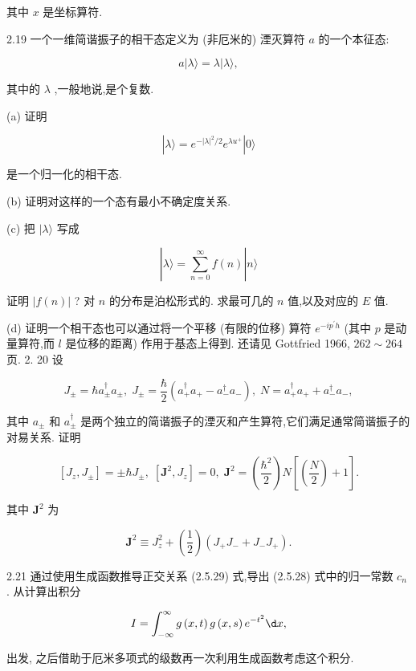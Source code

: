其中 $x$ 是坐标算符.

2.19 一个一维简谐振子的相干态定义为 (非厄米的) 湮灭算符 $a$ 的一个本征态:

$$
a\left| {\lambda \rangle = \lambda }\right| \lambda \rangle ,
$$

其中的 $\lambda$ ,一般地说,是个复数.

(a) 证明

$$
\left| {\lambda \rangle = {e}^{-{\left| \lambda \right| }^{2}/2}{e}^{\lambda {u}^{ + }}}\right| 0\rangle
$$

是一个归一化的相干态.

(b) 证明对这样的一个态有最小不确定度关系.

(c) 把 $|\lambda \rangle$ 写成

$$
\left| {\lambda \rangle = \mathop{\sum }\limits_{{n = 0}}^{\infty }f\left( n\right) }\right| n\rangle
$$

证明 $\left| {f\left( n\right) }\right|$ ? 对 $n$ 的分布是泊松形式的. 求最可几的 $n$ 值,以及对应的 $E$ 值.

(d) 证明一个相干态也可以通过将一个平移 (有限的位移) 算符 ${e}^{-i{p}^{\prime }h}$ (其中 $p$ 是动量算符,而 $l$ 是位移的距离) 作用于基态上得到. 还请见 Gottfried 1966, ${262} \sim {264}$ 页. 2. 20 设

$$
{J}_{ \pm } = \hbar {a}_{ \pm }^{ \dagger }{a}_{ \pm },\;{J}_{ \pm } = \frac{\hbar }{2}\left( {{a}_{ + }^{ \dagger }{a}_{ + } - {a}_{ - }^{ \dagger }{a}_{ - }}\right) ,\;N = {a}_{ + }^{ \dagger }{a}_{ + } + {a}_{ - }^{ \dagger }{a}_{ - },
$$

其中 ${a}_{ \pm }$ 和 ${a}_{ \pm }^{ \dagger }$ 是两个独立的简谐振子的湮灭和产生算符,它们满足通常简谐振子的对易关系. 证明

$$
\left\lbrack {{J}_{z},{J}_{ \pm }}\right\rbrack = \pm \hbar {J}_{ \pm },\;\left\lbrack {{\mathbf{J}}^{2},{J}_{z}}\right\rbrack = 0,\;{\mathbf{J}}^{2} = \left( \frac{{\hbar }^{2}}{2}\right) N\left\lbrack {\left( \frac{N}{2}\right) + 1}\right\rbrack .
$$

其中 ${\mathbf{J}}^{2}$ 为

$$
{\mathbf{J}}^{2} \equiv {J}_{z}^{2} + \left( \frac{1}{2}\right) \left( {{J}_{ + }{J}_{ - } + {J}_{ - }{J}_{ + }}\right) .
$$

2.21 通过使用生成函数推导正交关系 (2.5.29) 式,导出 (2.5.28) 式中的归一常数 ${c}_{n}$ . 从计算出积分

$$
I = \int_{-\infty }^{\infty }g\left( {x, t}\right) g\left( {x, s}\right) {e}^{-{t}^{2}}{\d x},
$$

出发, 之后借助于厄米多项式的级数再一次利用生成函数考虑这个积分.

